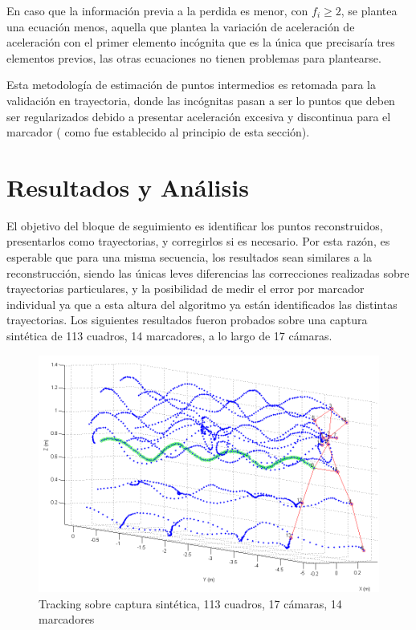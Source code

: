 En caso que la información previa a la perdida es menor, con $f_{i} \geq 2$, se plantea una ecuación menos, aquella que plantea la variación de aceleración de aceleración con el primer elemento incógnita que es la única que precisaría tres elementos previos, las otras ecuaciones no tienen problemas para plantearse.

Esta metodología de estimación de puntos intermedios es retomada para la validación en trayectoria, donde las incógnitas pasan a ser lo puntos que deben ser regularizados debido a presentar aceleración excesiva y discontinua para el marcador ( como fue establecido al principio de esta sección).




\section{Resultados y Análisis}

El objetivo del bloque de seguimiento es identificar los puntos reconstruidos, presentarlos como trayectorias, y corregirlos si es necesario. Por esta razón, es esperable que para una misma secuencia, los resultados sean similares a la reconstrucción, siendo las únicas leves diferencias las correcciones realizadas sobre trayectorias particulares, y la posibilidad de medir el error por marcador individual ya que a esta altura del algoritmo ya están identificados las distintas trayectorias. Los siguientes resultados fueron probados sobre una captura sintética de 113 cuadros, 14 marcadores, a lo largo de 17 cámaras.

\begin{figure}[hbt]
\begin{center}
\includegraphics[width=\linewidth]{img/Tracking/040_Salida_Tracking_Esqueleto_Trayectoria.png}
\end{center}
\vspace{-0.2cm}
\caption{Tracking sobre captura sintética, 113 cuadros, 17 cámaras, 14 marcadores}
\label{Tracking_Esqueleto_Trayectoria}
\end{figure}



